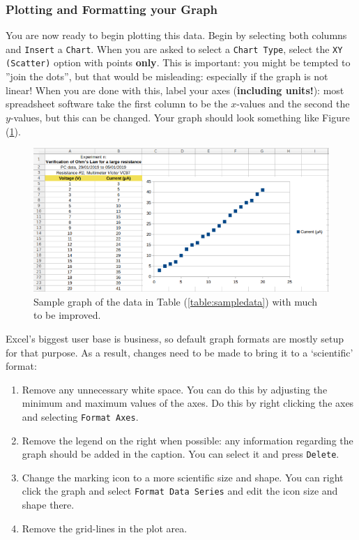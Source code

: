 \subsubsection{Plotting and Formatting your Graph}

You are now ready to begin plotting this data. Begin by selecting both columns and \texttt{Insert} a \texttt{Chart}. When you are asked to select a \texttt{Chart Type}, select the \texttt{XY (Scatter)} option with points \textbf{only}. This is important: you might be tempted to ”join the dots”, but that would be misleading: especially if the graph is not linear! When you are done with this, label your axes (\textbf{including units!}): most spreadsheet software take the first column to be the $x$-values and the second the $y$-values, but this can be changed. Your graph should look something like Figure (\ref{fig:samplegraph1}). 


\begin{figure}[!htb]
    \centering
    \includegraphics[scale=0.75]{figs/samplegraph1.png}
    \caption{Sample graph of the data in Table (\ref{table:sampledata}) with much to be improved.}
    \label{fig:samplegraph1}
\end{figure}


Excel's biggest user base is business, so default graph formats are mostly setup for that purpose. As a result, changes need to be made to bring it to a `scientific' format: \begin{enumerate}
    \item Remove any unnecessary white space. You can do this by adjusting the minimum and maximum values of the axes. Do this by right clicking the axes and selecting \texttt{Format Axes}.
    
    \item Remove the legend on the right when possible: any information regarding the graph should be added in the caption. You can select it and press \texttt{Delete}. 
    
    \item Change the marking icon to a more scientific size and shape. You can right click the graph and select \texttt{Format Data Series} and edit the icon size and shape there.
    
    \item Remove the grid-lines in the plot area.
\end{enumerate}

